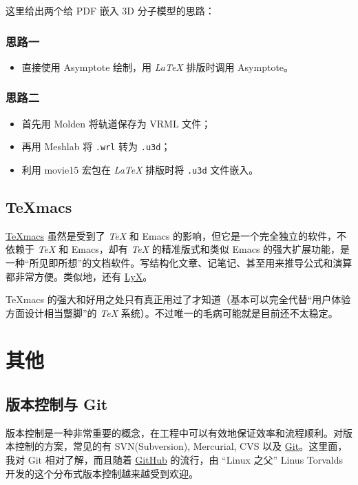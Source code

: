 \documentclass[a4paper,openany]{book}
\begin{document}
这里给出两个给 PDF 嵌入 3D 分子模型的思路：

\subsubsection{思路一}

\begin{itemize}
\item
  直接使用 Asymptote 绘制，用 \emph{\LaTeX} 排版时调用 Asymptote。
\end{itemize}

\subsubsection{思路二}

\begin{itemize}
\item
  首先用 Molden 将轨道保存为 VRML 文件；
\item
  再用 Meshlab 将 \texttt{.wrl} 转为 \texttt{.u3d}；
\item
  利用 movie15 宏包在 \emph{\LaTeX} 排版时将 \texttt{.u3d} 文件嵌入。
\end{itemize}

\subsection{TeXmacs}

\href{http://www.texmacs.org/tmweb/home/welcome.en.html}{TeXmacs} 虽然是受到了 \emph{\TeX} 和 Emacs 的影响，但它是一个完全独立的软件，不依赖于 \emph{\TeX} 和 Emacs，却有 \emph{\TeX} 的精准版式和类似 Emacs 的强大扩展功能，是一种“所见即所想”的文档软件。写结构化文章、记笔记、甚至用来推导公式和演算都非常方便。类似地，还有 \href{http://www.lyx.org}{LyX}。

TeXmacs 的强大和好用之处只有真正用过了才知道（基本可以完全代替“用户体验方面设计相当蹩脚”的 \emph{\TeX} 系统）。不过唯一的毛病可能就是目前还不太稳定。

\section{其他}

\subsection{版本控制与 Git}

版本控制是一种非常重要的概念，在工程中可以有效地保证效率和流程顺利。对版本控制的方案，常见的有 SVN(Subversion), Mercurial, CVS 以及 \href{http://git-scm.com}{Git}。这里面，我对 Git 相对了解，而且随着 \href{https://github.com}{GitHub} 的流行，由 “Linux 之父” Linus Torvalds 开发的这个分布式版本控制越来越受到欢迎。
\end{document}
